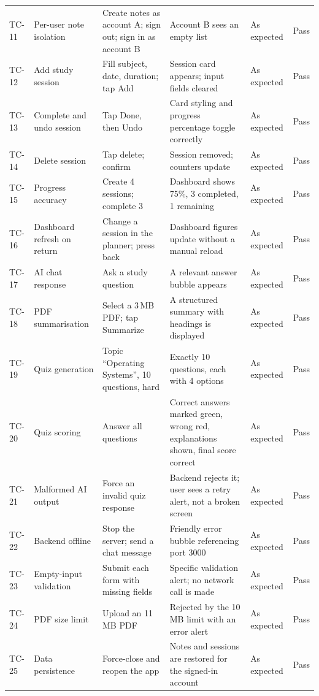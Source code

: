 \documentclass[12pt,a4paper,oneside]{report}
\begin{document}
\begin{landscape}
\begin{longtable}{@{}p{1.3cm}p{3.6cm}p{4.6cm}p{4.0cm}p{1.4cm}p{1.2cm}@{}}
TC-11 & Per-user note isolation & Create notes as account A; sign out; sign in as account B & Account B sees an empty list & As expected & Pass \\
TC-12 & Add study session & Fill subject, date, duration; tap Add & Session card appears; input fields cleared & As expected & Pass \\
TC-13 & Complete and undo session & Tap Done, then Undo & Card styling and progress percentage toggle correctly & As expected & Pass \\
TC-14 & Delete session & Tap delete; confirm & Session removed; counters update & As expected & Pass \\
TC-15 & Progress accuracy & Create 4 sessions; complete 3 & Dashboard shows 75\%, 3 completed, 1 remaining & As expected & Pass \\
TC-16 & Dashboard refresh on return & Change a session in the planner; press back & Dashboard figures update without a manual reload & As expected & Pass \\
TC-17 & AI chat response & Ask a study question & A relevant answer bubble appears & As expected & Pass \\
TC-18 & PDF summarisation & Select a 3\,MB PDF; tap Summarize & A structured summary with headings is displayed & As expected & Pass \\
TC-19 & Quiz generation & Topic ``Operating Systems'', 10 questions, hard & Exactly 10 questions, each with 4 options & As expected & Pass \\
TC-20 & Quiz scoring & Answer all questions & Correct answers marked green, wrong red, explanations shown, final score correct & As expected & Pass \\
TC-21 & Malformed AI output & Force an invalid quiz response & Backend rejects it; user sees a retry alert, not a broken screen & As expected & Pass \\
TC-22 & Backend offline & Stop the server; send a chat message & Friendly error bubble referencing port 3000 & As expected & Pass \\
TC-23 & Empty-input validation & Submit each form with missing fields & Specific validation alert; no network call is made & As expected & Pass \\
TC-24 & PDF size limit & Upload an 11\,MB PDF & Rejected by the 10\,MB limit with an error alert & As expected & Pass \\
TC-25 & Data persistence & Force-close and reopen the app & Notes and sessions are restored for the signed-in account & As expected & Pass \\
\bottomrule
\end{longtable}
\end{landscape}
\end{document}
